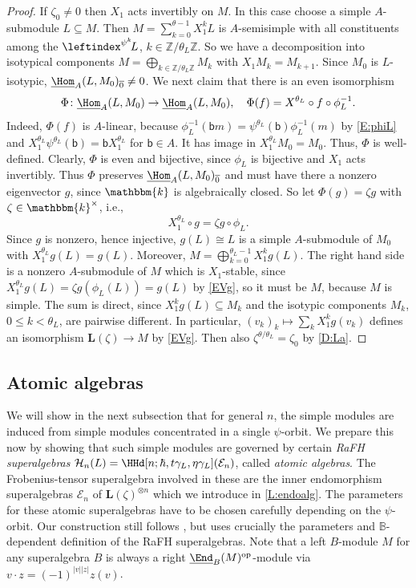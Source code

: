 \documentclass[a4paper,11pt]{amsart}
\newcommand{\uHom}{\underline{\Hom}}
\newcommand{\uEnd}{\underline{\End}}
\let\ov\overline
\numberwithin{equation}{subsection}
\theoremstyle{definition}
\theoremstyle{theorem}
\theoremstyle{remark}
\newcommand\bb{\mathsf{b}}
\newcommand\kk{\mathbbm{k}}
\newcommand\Z{\mathbb{Z}}
\newcommand{\Bo}{\mathbb{B}}
\begin{document}
\begin{proof}
   If $\zeta_0\ne0$ then $X_1$ acts invertibly on $M$.  In this case
  choose a simple $A$-submodule $L\subseteq M$.  Then
  $M=\sum_{k=0}^{{\theta}-1}X_1^k\!L$ is $A$-semisimple with all
  constituents among the $\leftindex^{\psi^k}\!L$, $k\in\Z/\theta_L\Z$. So we have a decomposition into isotypical components
  $M=\bigoplus_{k\in\Z/\theta_L\Z}M_k$  with
  $X_1M_k=M_{k+1}$.  Since $M_0$ is $L$-isotypic, $\uHom_A(L,M_0)_{\ov0}\ne0$.  We next claim that there is an even isomorphism
  \[\Phi\colon \uHom_A(L,M_0)\to \uHom_A(L,M_0),\quad   \Phi(f)=X^{\theta_L}\circ  f\circ\phi_L^{-1}.\]
 Indeed, $\Phi(f)$ is $A$-linear, because
  $\phi_L^{-1}(\bb m)=\psi^{\theta_L}(\bb)\phi_L^{-1}(m)$ by
  \autoref{E:phiL} and $X_1^{\theta_L}\psi^{\theta_L}(\bb)=\bb X_1^{\theta_L}$ for $\bb\in A$. It has image in
 $X_1^{\theta_L}M_0=M_0$. Thus, $\Phi$ is well-defined. Clearly, $\Phi$ is even  and bijective, since $\phi_L$ is bijective and $X_1$ acts invertibly. Thus $\Phi$ preserves $ \uHom_A(L,M_0)_{\ov0}$ and must have there a nonzero eigenvector $g$, since $\kk$ is algebraically closed. So let  $\Phi(g)=\zeta g$ with $\zeta\in\kk^\times$, i.e.,
  \begin{equation}\label{EVg}
  X_1^{\theta_L}\circ g=\zeta g\circ\phi_L .
  \end{equation}
   Since $g$ is nonzero, hence injective, $g(L)\cong L$ is a simple $A$-submodule of $M_0$ with
  $X_1^{{\theta_L}}g(L)=g(L)$. Moreover,
  $M=\bigoplus_{k=0}^{{\theta_L}-1}X_1^kg(L)$. The right hand side
   is a nonzero $A$-submodule of $M$ which is $X_1$-stable, since $X_1^{\theta_L}g(L)=\zeta g(\phi_L(L))=g(L)$ by \autoref{EVg},  so it must be  $M$, because $M$ is simple.  The sum is direct, since $X_1^kg(L)\subseteq M_k$ and the isotypic components $M_k$, $0\le k<\theta_L$, are pairwise different.
    In particular,
  $(v_k)_k\mapsto\sum_kX_1^kg(v_k)$ defines an isomorphism $\mathbf L(\zeta)\to M$ by \autoref{EVg}.
  Then also $\zeta^{\theta/\theta_L}=\zeta_0$ by \autoref{D:La}.
\end{proof}


\subsection{Atomic algebras}
We will show in the next subsection that for general $n$, the simple modules are  induced from simple modules
concentrated in a single $\psi$-orbit. We prepare this now by showing that such simple modules are governed by certain \emph{RaFH superalgebras} $\mathcal H_n(L)=\HHd[n;\hbar, t\gamma_L, \eta\gamma_L](\mathcal E_n)$, called \emph{atomic algebras}. The Frobenius-tensor superalgebra involved in these are the  inner endomorphism superalgebras $\mathcal E_n$ of $\mathbf L(\zeta)^{\otimes n}$ which we introduce in \autoref{L:endoalg}. The  parameters for these atomic superalgebras have to be chosen carefully depending on the $\psi$-orbit.  Our construction still follows \cite[\S5]{Savage:AffineWreath}, but uses crucially the  parameters and $\Bo$-dependent definition of the RaFH superalgebras. Note that a left $B$-module $M$ for any superalgebra $B$ is always
 a right $\uEnd_B(M)^{\mathrm{op}}$-module via
$v\cdot z=(-1)^{|v||z|}z(v)$. \\
\end{document}
